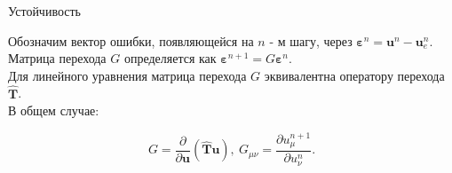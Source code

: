 \documentclass[10pt,xcolor=pst,aspectratio=169]{beamer}
\begin{document}
%
%
%
%

\begin{frame}{Устойчивость}

	\transdissolve[duration=0.1]
	\justifying
	\large

	Обозначим вектор ошибки, появляющейся на $n$ - м шагу, через $\bm{\varepsilon}^{n} = \mathbf{u}^{n} - \mathbf{u}^{n}_{e}$.\\

	Матрица перехода $G$ определяется как $\bm{\varepsilon}^{n + 1} = G \bm{\varepsilon}^{n}$.\\

	Для линейного уравнения матрица перехода $G$ эквивалентна оператору перехода $\hat{\textbf{T}}$.\\

	В общем случае:

	\[
		G = \frac{\partial}{\partial \textbf{u}} \left( \hat{\textbf{T}} \textbf{u} \right), \: G_{\mu \nu} = \frac{\partial u^{n + 1}_{\mu}}{\partial u^{n}_{\nu}}.
	\]

\end{frame}
\end{document}
